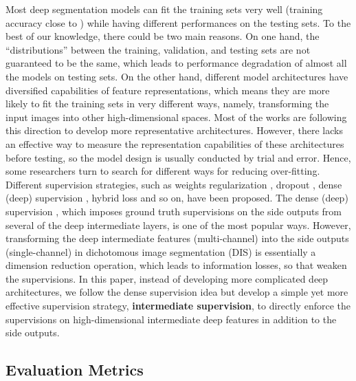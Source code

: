 \documentclass[10pt,twocolumn,letterpaper]{article}
\begin{document}
Most deep segmentation models can fit the training sets very well (training accuracy close to ) while having different performances on the testing sets. 
To the best of our knowledge, there could be two main reasons. 
On one hand, the ``distributions'' between the training, validation, and testing sets are not guaranteed to be the same, which leads to performance degradation of almost all the models on testing sets. 
On the other hand, different model architectures have diversified capabilities of feature representations, which means they are more likely to fit the training sets in very different ways, namely, transforming the input images into other high-dimensional spaces. 
Most of the works are following this direction to develop more representative architectures. 
However, there lacks an effective way to measure the representation capabilities of these architectures before testing, so the model design is usually conducted by trial and error. 
Hence, some researchers turn to search for different ways for reducing over-fitting. Different supervision strategies, such as weights regularization \cite{Goodfellow-et-al-2016}, dropout \cite{DBLP:journals/jmlr/SrivastavaHKSS14}, dense (deep) supervision \cite{lee2015deeply,qin2020u2,xie2015holistically}, hybrid loss \cite{luc2016semantic, qin2019basnet,zhao2019egnet} and so on, have been proposed. 
The dense (deep) supervision \cite{lee2015deeply,xie2015holistically,qin2020u2}, which imposes ground truth supervisions on the side outputs from several of the deep intermediate layers, is one of the most popular ways. 
However, transforming the deep intermediate features (multi-channel) into the side outputs (single-channel) in dichotomous image segmentation (DIS) is essentially a dimension reduction operation, which leads to information losses, so that weaken the supervisions.
In this paper, instead of developing more complicated deep architectures, we follow the dense supervision idea but develop a simple yet more effective supervision strategy, \textbf{intermediate supervision}, to directly enforce the supervisions on high-dimensional intermediate deep features in addition to the side outputs. 

\subsection{Evaluation Metrics}
\end{document}
